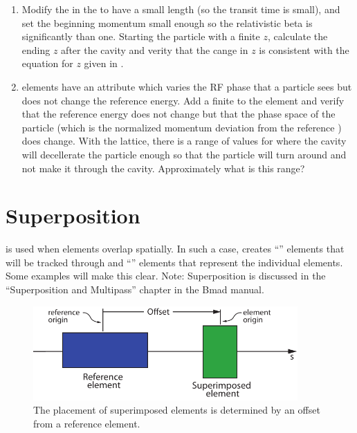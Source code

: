 \documentclass{hitec}     %
\newcommand{\Section}[1]{\section{#1}\vspace*{-1ex}}
\begin{document}
\begin{enumerate}[label=\thesection.\arabic{enumi}]
\item 
Modify the  in the  to have a small length (so the transit time is
small), and set the beginning momentum small enough so the relativistic beta is significantly than
one. Starting the particle with a finite $z$, calculate the ending $z$ after the cavity and verity
that the cange in $z$ is consistent with the equation for $z$ given in .
%
\item
{} elements have an attribute  which varies the RF phase that a particle sees
but does not change the reference energy. Add a finite  to the  element and
verify that the reference energy does not change but that the phase space  of the particle
(which is the normalized momentum deviation from the reference ) does
change. With the  lattice, there is a range of values for  where the
cavity will decellerate the particle enough so that the particle will turn around and not make
it through the cavity. Approximately what is this range?
\end{enumerate}

\newpage

\Section{Superposition}
\label{s:super}

 is used when elements overlap spatially. In such a case, \bmad creates
``'' elements that will be tracked through and ``'' elements that represent the
individual elements.  Some examples will make this clear. Note: Superposition is discussed in the
``Superposition and Multipass'' chapter in the Bmad manual.

\begin{figure}[b]
  \centering
  \includegraphics[width=0.9\textwidth]{superimpose.pdf}
  \caption{The placement of superimposed elements is determined by an offset from a reference element.}
  \label{f:superimpose}
\end{figure}
\end{document}

